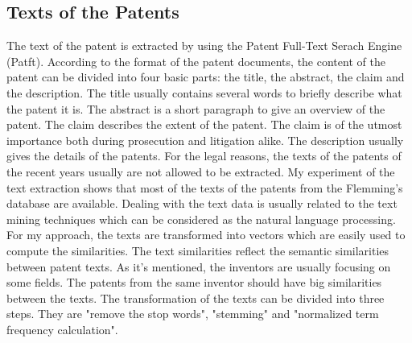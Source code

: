 \subsection{Texts of the Patents}
The text of the patent is extracted by using the Patent Full-Text Serach Engine (Patft).  According to the format of the patent documents, the content of the patent can be divided into four basic parts: the title, the abstract, the claim and the description. The title usually contains several words to briefly describe what the patent it is. The abstract is a short paragraph to give an overview of the patent. The claim describes the extent of the patent. The claim is of the utmost importance both during prosecution and litigation alike. The description usually gives the details of the patents. For the legal reasons, the texts of the patents of the recent years usually are not allowed to be extracted. My experiment of the text extraction shows that most of the texts of the patents from the Flemming's database are available. Dealing with the text data is usually related to the text mining techniques which can be considered as the natural language processing. For my approach, the texts are transformed into vectors which are easily used to compute the similarities. The text similarities  reflect the semantic similarities between patent texts. As it's mentioned, the inventors are usually focusing on some fields. The patents from the same inventor should have big similarities between the texts. The transformation of the texts can be divided into three steps. They are "remove the stop words", "stemming" and "normalized term frequency calculation". 

